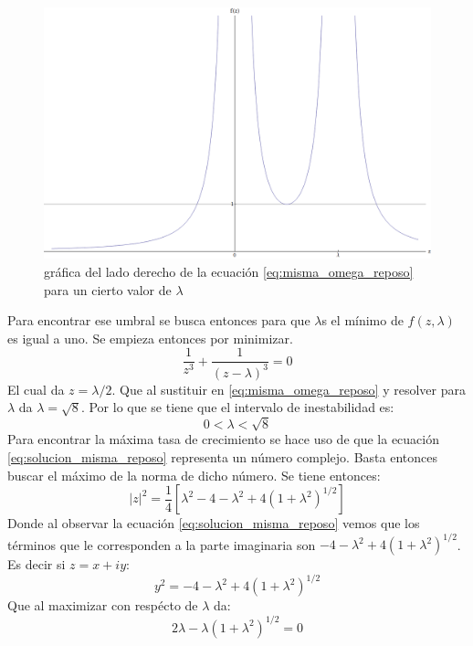 \documentclass[12pt]{article}
\begin{document}
\begin{figure}
\includegraphics[height=0.3\paperheight]{f_z_reposo.png}
\caption{gráfica del lado derecho de la ecuación \ref{eq:misma_omega_reposo} para un cierto valor de $\lambda$}
\label{fig:fz_reposo}
\end{figure}
Para encontrar ese umbral se busca entonces para que $\lambda$s el mínimo de $f(z,\lambda)$ es igual a uno. Se empieza entonces por minimizar.
\begin{equation}
\frac{1}{z^3} + \frac{1}{(z-\lambda)^3}=0
\end{equation}
El cual da $z=\lambda / 2$. Que al sustituir en \ref{eq:misma_omega_reposo} y resolver para $\lambda$ da $\lambda = \sqrt{8}$. Por lo que se tiene que el intervalo de inestabilidad es:
\begin{equation}
0 < \lambda < \sqrt{8}
\end{equation}
Para encontrar la máxima tasa de crecimiento se hace uso de que la ecuación \ref{eq:solucion_misma_reposo} representa un número complejo. Basta entonces buscar el máximo de la norma de dicho número. Se tiene entonces:
\begin{equation}
|z|^2 = \frac{1}{4}[\lambda^2 -4 - \lambda^2 + 4(1 + \lambda^2)^{1/2}]
\end{equation}
Donde al observar la ecuación \ref{eq:solucion_misma_reposo} vemos que los términos que le corresponden a la parte imaginaria son $-4 - \lambda^2 + 4(1 + \lambda^2)^{1/2}$. Es decir si $z=x +iy$:
\begin{equation}
y^2= -4 - \lambda^2 + 4(1 + \lambda^2)^{1/2}
\end{equation}
Que al maximizar con respécto de $\lambda$ da:
\begin{equation}
2\lambda -\lambda(1 + \lambda^2)^{1/2} =0
\end{equation}
\end{document}

